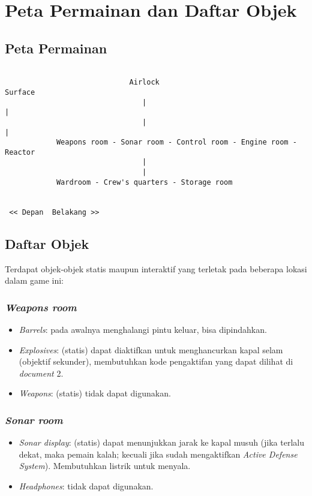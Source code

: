 \documentclass[a4paper,titlepage]{article}
\begin{document}
	\section{Peta Permainan dan Daftar Objek}

		\subsection{Peta Permainan}

			\begin{lstlisting}

			                 Airlock                                 Surface
			                    |                                       |
			                    |                                       |
			Weapons room - Sonar room - Control room - Engine room - Reactor
			                    |
			                    |
			Wardroom - Crew's quarters - Storage room


 << Depan  Belakang >>

			\end{lstlisting}

		\subsection{Daftar Objek}

			\noindent Terdapat objek-objek statis maupun interaktif yang terletak pada beberapa lokasi dalam game ini:

			\subsubsection{\textit{Weapons room}}
			\begin{itemize}
				\item \textit{Barrels}: pada awalnya menghalangi pintu keluar, bisa dipindahkan.
				\item \textit{Explosives}: (statis) dapat diaktifkan untuk menghancurkan kapal selam (objektif sekunder), membutuhkan kode pengaktifan yang dapat dilihat di \textit{document} 2.
				\item \textit{Weapons}: (statis) tidak dapat digunakan.
			\end{itemize}

			\subsubsection{\textit{Sonar room}}
			\begin{itemize}
				\item \textit{Sonar display}: (statis) dapat menunjukkan jarak ke kapal musuh (jika terlalu dekat, maka pemain kalah; kecuali jika sudah mengaktifkan \textit{Active Defense System}). Membutuhkan listrik untuk menyala.
				\item \textit{Headphones}: tidak dapat digunakan.
			\end{itemize}
\end{document}
